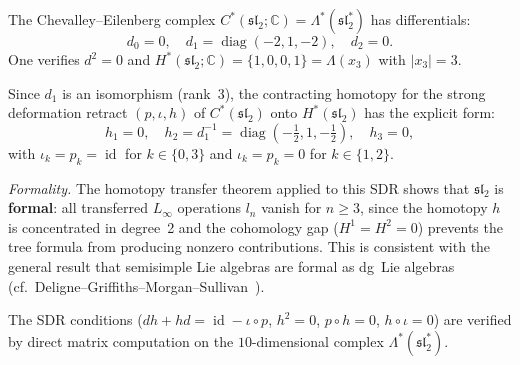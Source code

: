 \begin{computation}
\label{comp:sl2-ce-sdr}
\ClaimStatusProvedHere
{}

The Chevalley--Eilenberg complex
$C^*(\mathfrak{sl}_2; \mathbb{C})
= \Lambda^*(\mathfrak{sl}_2^*)$
has differentials:
\begin{equation}\label{eq:sl2-ce-diff}
d_0 = 0, \quad
d_1 = \operatorname{diag}(-2, 1, -2), \quad
d_2 = 0.
\end{equation}
One verifies $d^2 = 0$ and
$H^*(\mathfrak{sl}_2; \mathbb{C}) = \{1, 0, 0, 1\}
= \Lambda(x_3)$ with $|x_3| = 3$.

Since $d_1$ is an isomorphism (rank~3), the contracting homotopy
for the strong deformation retract
$(p, \iota, h)$ of
$C^*(\mathfrak{sl}_2)$
onto $H^*(\mathfrak{sl}_2)$
has the explicit form:
\begin{equation}\label{eq:sl2-sdr}
h_1 = 0, \quad
h_2 = d_1^{-1} = \operatorname{diag}(-\tfrac{1}{2}, 1, -\tfrac{1}{2}), \quad
h_3 = 0,
\end{equation}
with $\iota_k = p_k = \operatorname{id}$ for $k \in \{0, 3\}$
and $\iota_k = p_k = 0$ for $k \in \{1, 2\}$.

\emph{Formality.}
The homotopy transfer theorem applied to this SDR shows that
$\mathfrak{sl}_2$ is \textbf{formal}: all transferred $L_\infty$
operations $l_n$ vanish for $n \geq 3$, since the homotopy $h$
is concentrated in degree~2 and the cohomology gap
($H^1 = H^2 = 0$) prevents the tree formula from producing
nonzero contributions.  This is consistent with the general
result that semisimple Lie algebras are formal as dg~Lie algebras
(cf.\ Deligne--Griffiths--Morgan--Sullivan~\cite{DGMS75}).

The SDR conditions
($dh + hd = \operatorname{id} - \iota \circ p$,
$h^2 = 0$, $p \circ h = 0$, $h \circ \iota = 0$)
are verified by direct matrix computation on the
$10$-dimensional complex $\Lambda^*(\mathfrak{sl}_2^*)$.
\end{computation}

